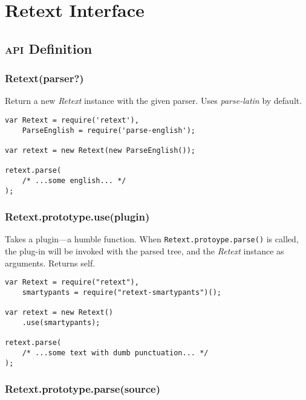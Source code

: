 
\chapter{Retext Interface}\label{appendix-retext}

\section*{\textsc{api} Definition}

\subsection*{Retext(parser?)}

Return a new \emph{Retext} instance with the given parser.
Uses \emph{parse-latin} by default.

\begin{lstlisting}
var Retext = require('retext'),
    ParseEnglish = require('parse-english');

var retext = new Retext(new ParseEnglish());

retext.parse(
    /* ...some english... */
);
\end{lstlisting}

\subsection*{Retext.prototype.use(plugin)}

Takes a plugin---a humble function.
When \lstinline{Retext.protoype.parse()} is called, the plug-in will be
  invoked with the parsed tree, and the \emph{Retext} instance as arguments.
Returns self.

\begin{lstlisting}
var Retext = require("retext"),
    smartypants = require("retext-smartypants")();

var retext = new Retext()
    .use(smartypants);

retext.parse(
    /* ...some text with dumb punctuation... */
);
\end{lstlisting}

\subsection*{Retext.prototype.parse(source)}

